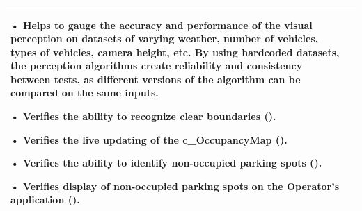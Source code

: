 \documentclass[12pt, titlepage]{article}
\begin{document}
\begin{table}[!h]
\begin{center}
\begin{tabular}{ | m{3.2cm} | m{12.2cm} | }
• Helps to gauge the accuracy and performance of the visual perception on datasets of varying weather, number of vehicles, types of vehicles, camera height, etc. By using hardcoded datasets, the perception algorithms create reliability and consistency between tests, as different versions of the algorithm can be compared on the same inputs.

• Verifies the ability to recognize clear boundaries (\nameref{GEN_001}).

• Verifies the live updating of the c_OccupancyMap (\nameref{GEN_002}).

• Verifies the ability to identify non-occupied parking spots (\nameref{Gen_005}).

• Verifies display of non-occupied parking spots on the Operator's application (\nameref{GEN_006}).
\\ 
\hline
\end{tabular}
\end{center}
\end{table}
\end{document}
